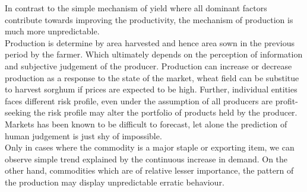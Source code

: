 \documentclass[nojss]{jss}\usepackage[]{graphicx}\usepackage[]{color}
\begin{document}
In contrast to the simple mechanism of yield where all dominant
factors contribute towards improving the productivity, the mechanism
of production is much more unpredictable. \\

Production is determine by area harvested and hence area sown in the
previous period by the farmer. Which ultimately depends on the
perception of information and subjective judgement of the
producer. Production can increase or decrease production as a response
to the state of the market, wheat field can be substitue to harvest
sorghum if prices are expected to be high. Further, individual
entities faces different risk profile, even under the assumption of
all producers are profit-seeking the risk profile may alter the
portfolio of products held by the producer. Markets has been known to
be difficult to forecast, let alone the prediction of human judgement
is just shy of impossible.\\

Only in cases where the commodity is a major staple or exporting item,
we can observe simple trend explained by the continuous increase in
demand. On the other hand, commodities which are of relative lesser
importance, the pattern of the production may display unpredictable
erratic behaviour.\\
\end{document}
